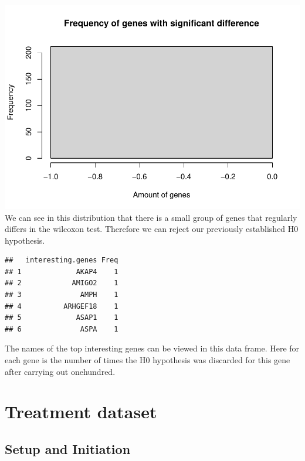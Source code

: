 \documentclass[
]{article}
\begin{document}
\includegraphics{Drug-sensitivity-in-cancer-cell-lines_files/figure-latex/unnamed-chunk-4-1.pdf}
We can see in this distribution that there is a small group of genes
that regularly differs in the wilcoxon test. Therefore we can reject our
previously established H0 hypothesis.

\begin{verbatim}
##   interesting.genes Freq
## 1             AKAP4    1
## 2            AMIGO2    1
## 3              AMPH    1
## 4          ARHGEF18    1
## 5             ASAP1    1
## 6              ASPA    1
\end{verbatim}

The names of the top interesting genes can be viewed in this data frame.
Here for each gene is the number of times the H0 hypothesis was
discarded for this gene after carrying out onehundred.

\hypertarget{treatment-dataset}{%
\section{Treatment dataset}\label{treatment-dataset}}

\hypertarget{setup-and-initiation}{%
\subsection{Setup and Initiation}\label{setup-and-initiation}}
\end{document}

